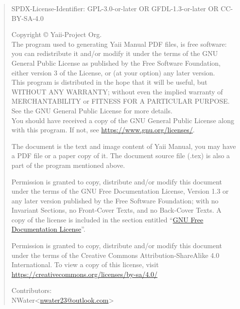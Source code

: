 \newpage\thispagestyle{empty}
\begin{quote}\footnotesize
SPDX-License-Identifier: GPL-3.0-or-later OR GFDL-1.3-or-later OR CC-BY-SA-4.0

Copyright \copyright{} {\the\year} Yaii-Project Org. \\
The program used to generating Yaii Manual PDF files, is free software: you can redistribute it and/or modify it under the terms of the GNU General Public License as published by the Free Software Foundation, either version 3 of the License, or (at your option) any later version. \\
This program is distributed in the hope that it will be useful, but WITHOUT ANY WARRANTY; without even the implied warranty of MERCHANTABILITY or FITNESS FOR A PARTICULAR PURPOSE. See the GNU General Public License for more details. \\
You should have received a copy of the GNU General Public License along with this program. If not, see \url{https://www.gnu.org/licenses/}.

The document is the text and image content of Yaii Manual, you may have a PDF file or a paper copy of it. The document source file (.tex) is also a part of the program mentioned above.

Permission is granted to copy, distribute and/or modify this document
under the terms of the GNU Free Documentation License, Version 1.3
or any later version published by the Free Software Foundation;
with no Invariant Sections, no Front-Cover Texts, and no Back-Cover Texts.
A copy of the license is included in the section entitled ``\hyperref[label_fdl]{GNU
Free Documentation License}''.

Permission is granted to copy, distribute and/or modify this document
under the terms of the Creative Commons Attribution-ShareAlike 4.0 International. To view a copy of this license, visit \url{https://creativecommons.org/licenses/by-sa/4.0/}

Contributors: \\
NWater<\href{mailto:nwater23@outlook.com}{nwater23@outlook.com}>
\end{quote}

\endinput
